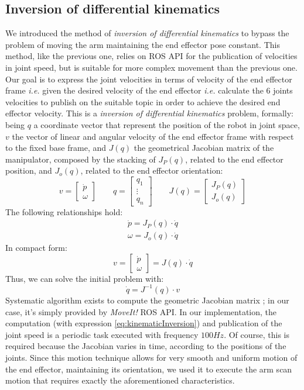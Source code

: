 \subsection{Inversion of differential kinematics}
We introduced the method of \textit{inversion of differential kinematics} to bypass the problem of moving the arm maintaining the end effector pose constant. This method, like the previous one, relies on \ac{ROS} \ac{API} for the publication of velocities in joint speed, but is suitable for more complex movement than the previous one. Our goal is to express the joint velocities in terms of velocity of the end effector frame \textit{i.e.} given the desired velocity of the end effector \textit{i.e.} calculate the 6 joints velocities to publish on the suitable topic in order to achieve the desired end effector velocity. 
This is a \textit{inversion of differential kinematics} problem, formally: being $q$ a coordinate vector that represent the position of the robot in joint space, 
$v$ the vector of linear and angular velocity of the end effector frame with respect to the fixed base frame, and $J(q)$ the geometrical Jacobian matrix of the manipulator, composed by the stacking of $J_P(q)$, related to the end effector position, and $J_o(q)$, related to the end effector orientation: 
\[
v = \left[\begin{array}{c}\dot{p} \\ \omega\end{array}\right] 	\qquad
q = \left[\begin{array}{c} q_1 \\ \vdots \\ q_n \end{array}\right]	\qquad
J(q) =  \left[\begin{array}{c} J_P(q) \\ J_o(q) \end{array}\right]
\]
 The following relationships hold: \\
 \begin{align*}
 \dot{p} = J_P(q)\cdot\dot{q} \\
 \omega = J_o(q)\cdot\dot{q} 
\end{align*}
In compact form:
\[
v = \left[\begin{array}{c}\dot{p} \\ \omega\end{array}\right] = J(q)\cdot\dot{q}
\]
Thus, we can solve the initial problem with: \\
\begin{equation}\label{eq:kinematicInversion}
\dot{q} = J^{-1}(q)\cdot v
\end{equation}
Systematic algorithm exists to compute the geometric Jacobian matrix \parencite{jacobian}; in our case, it's simply provided by \textit{MoveIt!} \ac{ROS} \ac{API}. 
In our implementation, the computation (with expression \ref{eq:kinematicInversion}) and publication of the joint speed is a periodic task executed with frequency $100Hz$. Of course, this is required because the Jacobian varies in time, according to the positions of the joints. Since this motion technique allows for very smooth and uniform motion of the end effector, maintaining its orientation, we used it to execute the arm scan motion that requires exactly the aforementioned characteristics.

